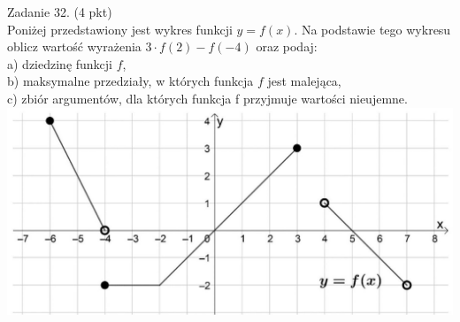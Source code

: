 \documentclass[10pt]{article}
\begin{document}
Zadanie 32. (4 pkt)\\
Poniżej przedstawiony jest wykres funkcji \(y=f(x)\). Na podstawie tego wykresu oblicz wartość wyrażenia \(3 \cdot f(2)-f(-4)\) oraz podaj:\\
a) dziedzinę funkcji \(f\),\\
b) maksymalne przedziały, w których funkcja \(f\) jest malejąca,\\
c) zbiór argumentów, dla których funkcja f przyjmuje wartości nieujemne.\\
\includegraphics[max width=\textwidth, center]{2024_11_21_23d228cacd5e4a9a3f86g-11}
\end{document}
